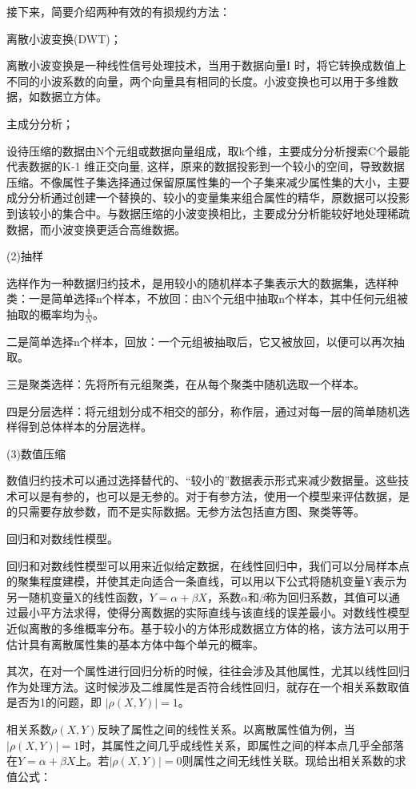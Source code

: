 接下来，简要介绍两种有效的有损规约方法：

离散小波变换(DWT)；

离散小波变换是一种线性信号处理技术，当用于数据向量I 时，将它转换成数值上不同的小波系数的向量，两个向量具有相同的长度。小波变换也可以用于多维数据，如数据立方体。

主成分分析；

设待压缩的数据由N个元组或数据向量组成，取k个维，主要成分分析搜索C个最能代表数据的K-1 维正交向量, 这样，原来的数据投影到一个较小的空间，导致数据压缩。不像属性子集选择通过保留原属性集的一个子集来减少属性集的大小，主要成分分析通过创建一个替换的、较小的变量集来组合属性的精华，原数据可以投影到该较小的集合中。与数据压缩的小波变换相比，主要成分分析能较好地处理稀疏数据，而小波变换更适合高维数据。

(2)抽样

选样作为一种数据归约技术，是用较小的随机样本子集表示大的数据集，选样种类：一是简单选择n个样本，不放回：由N个元组中抽取n个样本，其中任何元组被抽取的概率均为$\frac{1}{N}$。

二是简单选择n个样本，回放：一个元组被抽取后，它又被放回，以便可以再次抽取。

三是聚类选样：先将所有元组聚类，在从每个聚类中随机选取一个样本。

四是分层选样：将元组划分成不相交的部分，称作层，通过对每一层的简单随机选样得到总体样本的分层选样。

(3)数值压缩

数值归约技术可以通过选择替代的、“较小的”数据表示形式来减少数据量。这些技术可以是有参的，也可以是无参的。对于有参方法，使用一个模型来评估数据，是的只需要存放参数，而不是实际数据。无参方法包括直方图、聚类等等。

回归和对数线性模型。

回归和对数线性模型可以用来近似给定数据，在线性回归中，我们可以分局样本点的聚集程度建模，并使其走向适合一条直线，可以用以下公式将随机变量Y表示为另一随机变量X的线性函数，$Y=\alpha+\beta X$，系数$\alpha$和$\beta$称为回归系数，其值可以通过最小平方法求得，使得分离数据的实际直线与该直线的误差最小。对数线性模型近似离散的多维概率分布。基于较小的方体形成数据立方体的格，该方法可以用于估计具有离散属性集的基本方体中每个单元的概率。

其次，在对一个属性进行回归分析的时候，往往会涉及其他属性，尤其以线性回归作为处理方法。这时候涉及二维属性是否符合线性回归，就存在一个相关系数取值是否为1的问题，即
$|\rho(X,Y)|=1$。

相关系数$\rho(X,Y)$反映了属性之间的线性关系。以离散属性值为例，当$|\rho(X,Y)|=1$时，其属性之间几乎成线性关系，即属性之间的样本点几乎全部落在$Y=\alpha+\beta X$上。若$|\rho(X,Y)|=0$则属性之间无线性关联。现给出相关系数的求值公式：

